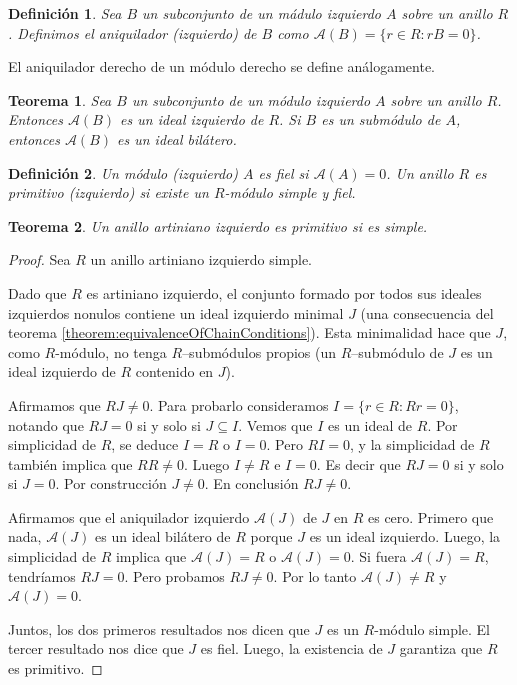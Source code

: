 \documentclass{report}
\newtheorem{theorem}{Teorema}
\newtheorem{definition}{Definición}
\begin{document}
  \begin{definition}
    Sea \(B\) un subconjunto de un mádulo izquierdo \(A\) sobre un anillo \(R\).
    Definimos el \emph{aniquilador (izquierdo)} de \(B\) como \(\mathcal{A}(B) = \{r \in R : r B = 0\}\).
  \end{definition}

  El aniquilador derecho de un módulo derecho se define análogamente.

  \begin{theorem}
    \label{theorem:anihilatorTheorem}
    Sea \(B\) un subconjunto de un módulo izquierdo \(A\) sobre un anillo \(R\).
    Entonces \(\mathcal{A}(B)\) es un ideal izquierdo de \(R\).
    Si \(B\) es un submódulo de \(A\), entonces \(\mathcal{A}(B)\) es un ideal bilátero.
  \end{theorem}

  \begin{definition}
    Un módulo (izquierdo) \(A\) es \emph{fiel} si \(\mathcal{A}(A) = 0\).
    Un anillo \(R\) es \emph{primitivo} (\emph{izquierdo}) si existe un \(R\)-módulo simple y fiel.
  \end{definition}

  \begin{theorem}
    \label{theorem:simpleLeftArtinianRingsArePrimitive}
    Un anillo artiniano izquierdo es primitivo si es simple.
  \end{theorem}
  \begin{proof}
    Sea \(R\) un anillo artiniano izquierdo simple.

    Dado que \(R\) es artiniano izquierdo, el conjunto formado por todos sus ideales izquierdos nonulos contiene un ideal izquierdo minimal \(J\) (una consecuencia del teorema \ref{theorem:equivalenceOfChainConditions}).
    Esta minimalidad hace que \(J\), como \(R\)-módulo, no tenga \(R\)--submódulos propios (un \(R\)--submódulo de \(J\) es un ideal izquierdo de \(R\) contenido en \(J\)).

    Afirmamos que \(R J \neq 0\).
    Para probarlo consideramos \(I = \{r \in R :  R r = 0\}\), notando que \(R J = 0\) si y solo si \(J \subseteq I\).
    Vemos que \(I\) es un ideal de \(R\).
    Por simplicidad de \(R\), se deduce \(I = R\) o \(I = 0\).
    Pero \(R I = 0\), y la simplicidad de \(R\) también implica que \(R R \neq 0\).
    Luego \(I \neq R\) e \(I = 0\).
    Es decir que \(R J = 0\) si y solo si \(J = 0\).
    Por construcción \(J \neq 0\).
    En conclusión \(R J \neq 0\).

    Afirmamos que el aniquilador izquierdo \(\mathcal{A}(J)\) de \(J\) en \(R\) es cero.
    Primero que nada, \(\mathcal{A}(J)\) es un ideal bilátero de \(R\) porque \(J\) es un ideal izquierdo.
    Luego, la simplicidad de \(R\) implica que \(\mathcal{A}(J) = R\) o \(\mathcal{A}(J) = 0\).
    Si fuera \(\mathcal{A}(J) = R\), tendríamos \(R J = 0\).
    Pero probamos \(R J \neq 0\).
    Por lo tanto \(\mathcal{A}(J) \neq R\) y \(\mathcal{A}(J) = 0\).

    Juntos, los dos primeros resultados nos dicen que \(J\) es un \(R\)-módulo simple.
    El tercer resultado nos dice que \(J\) es fiel.
    Luego, la existencia de \(J\) garantiza que \(R\) es primitivo.
  \end{proof}
\end{document}

